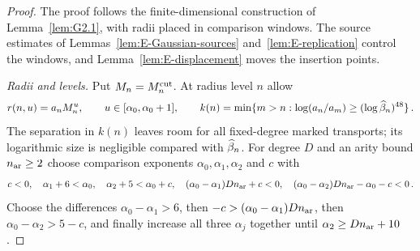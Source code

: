 \begin{proof}
The proof follows the finite-dimensional construction of Lemma~\ref{lem:G2.1}, with radii placed in comparison windows. The source estimates of Lemmas~\ref{lem:E-Gaussian-sources} and~\ref{lem:E-replication} control the windows, and Lemma~\ref{lem:E-displacement} moves the insertion points.

\emph{Radii and levels.} Put $M_n=M^{\mathrm{cut}}_n$. At radius level $n$ allow
\begin{equation}\label{eq:I-reading}
r(n,u)=a_nM_n^u,\qquad u\in[\alpha_0,\alpha_0+1],\qquad
k(n)=\min\{m>n:\log(a_n/a_m)\ge(\log\widehat{\beta}_n)^{48}\}\,.
\end{equation}
The separation in $k(n)$ leaves room for all fixed-degree marked transports; its logarithmic size is negligible compared with $\widehat{\beta}_n$. For degree $D$ and an arity bound $n_{\rm ar}\ge2$ choose comparison exponents $\alpha_0,\alpha_1,\alpha_2$ and $c$ with
\begin{equation*}
 c<0,\quad \alpha_1+6<\alpha_0,\quad \alpha_2+5<\alpha_0+c,\quad
 (\alpha_0-\alpha_1)Dn_{\rm ar}+c<0,\quad
 (\alpha_0-\alpha_2)Dn_{\rm ar}-\alpha_0-c<0\,.
\end{equation*}
Choose the differences $\alpha_0-\alpha_1>6$, then $-c>(\alpha_0-\alpha_1)Dn_{\rm ar}$, then $\alpha_0-\alpha_2>5-c$, and finally increase all three $\alpha_j$ together until $\alpha_2\ge Dn_{\rm ar}+10$.


\end{proof}
